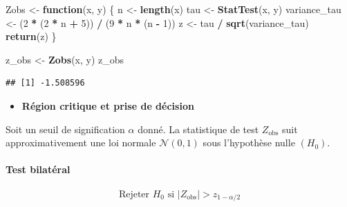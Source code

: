 \documentclass[
  12pt,
]{article}
\newenvironment{Shaded}{\begin{snugshade}}{\end{snugshade}}
\newcommand{\ControlFlowTok}[1]{\textcolor[rgb]{0.13,0.29,0.53}{\textbf{#1}}}
\newcommand{\DecValTok}[1]{\textcolor[rgb]{0.00,0.00,0.81}{#1}}
\newcommand{\FunctionTok}[1]{\textcolor[rgb]{0.13,0.29,0.53}{\textbf{#1}}}
\newcommand{\NormalTok}[1]{#1}
\newcommand{\OtherTok}[1]{\textcolor[rgb]{0.56,0.35,0.01}{#1}}
\newcommand{\SpecialCharTok}[1]{\textcolor[rgb]{0.81,0.36,0.00}{\textbf{#1}}}
\providecommand{\tightlist}{%
  \setlength{\itemsep}{0pt}\setlength{\parskip}{0pt}}
\begin{document}
\begin{Shaded}
\begin{Highlighting}[]
\NormalTok{Zobs }\OtherTok{\textless{}{-}} \ControlFlowTok{function}\NormalTok{(x, y) \{}
\NormalTok{  n }\OtherTok{\textless{}{-}} \FunctionTok{length}\NormalTok{(x)}
\NormalTok{  tau }\OtherTok{\textless{}{-}} \FunctionTok{StatTest}\NormalTok{(x, y)}
\NormalTok{  variance\_tau }\OtherTok{\textless{}{-}}\NormalTok{ (}\DecValTok{2} \SpecialCharTok{*}\NormalTok{ (}\DecValTok{2} \SpecialCharTok{*}\NormalTok{ n }\SpecialCharTok{+} \DecValTok{5}\NormalTok{)) }\SpecialCharTok{/}\NormalTok{ (}\DecValTok{9} \SpecialCharTok{*}\NormalTok{ n }\SpecialCharTok{*}\NormalTok{ (n }\SpecialCharTok{{-}} \DecValTok{1}\NormalTok{))}
\NormalTok{  z }\OtherTok{\textless{}{-}}\NormalTok{ tau }\SpecialCharTok{/} \FunctionTok{sqrt}\NormalTok{(variance\_tau)}
  \FunctionTok{return}\NormalTok{(z)}
\NormalTok{\}}

\NormalTok{z\_obs }\OtherTok{\textless{}{-}} \FunctionTok{Zobs}\NormalTok{(x, y)}
\NormalTok{z\_obs}
\end{Highlighting}
\end{Shaded}

\begin{verbatim}
## [1] -1.508596
\end{verbatim}

\begin{itemize}
\tightlist
\item
  \textbf{Région critique et prise de décision}
\end{itemize}

Soit un seuil de signification \(\alpha\) donné. La statistique de test
\(Z_{\text{obs}}\) suit approximativement une loi normale
\(\mathcal{N}(0,1)\) sous l'hypothèse nulle \((H_0)\).

\paragraph{Test bilatéral}\label{test-bilatuxe9ral}

\[
\text{Rejeter } H_0 \text{ si } |Z_{\text{obs}}| > z_{1 - \alpha/2}
\]
\end{document}
